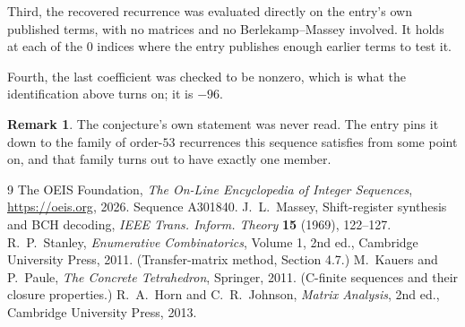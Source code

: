 \documentclass[11pt,a4paper]{article}
\theoremstyle{plain}
\theoremstyle{definition}
\newtheorem{remark}[theorem]{Remark}
\begin{document}
Third, the recovered recurrence was evaluated directly on the entry's own published terms, with
no matrices and no Berlekamp--Massey involved. It holds at each of the $0$ indices where
the entry publishes enough earlier terms to test it.

Fourth, the last coefficient was checked to be nonzero, which is what the identification above
turns on; it is $-96$.

\begin{remark}
The conjecture's own statement was never read. The entry pins it down to the family of
order-$53$ recurrences this sequence satisfies from some point on, and that family turns
out to have exactly one member.
\end{remark}

\begin{thebibliography}{9}
 The OEIS Foundation, \emph{The On-Line Encyclopedia of Integer
Sequences}, \url{https://oeis.org}, 2026. Sequence A301840.
 J.~L.~Massey, Shift-register synthesis and BCH decoding, \emph{IEEE
Trans. Inform. Theory} \textbf{15} (1969), 122--127.
 R.~P.~Stanley, \emph{Enumerative Combinatorics}, Volume 1, 2nd ed.,
Cambridge University Press, 2011. (Transfer-matrix method, Section 4.7.)
 M.~Kauers and P.~Paule, \emph{The Concrete Tetrahedron}, Springer, 2011.
(C-finite sequences and their closure properties.)
 R.~A.~Horn and C.~R.~Johnson, \emph{Matrix Analysis}, 2nd ed., Cambridge
University Press, 2013.
\end{thebibliography}
\end{document}
